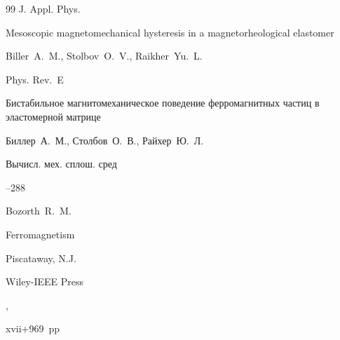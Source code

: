 \begin{thebibliography}{99}
\jour J. Appl. Phys.





 \nofrills





\paper Mesoscopic magnetomechanical hysteresis in a magnetorheological elastomer

\by Biller~A.~M., Stolbov~O.~V., Raikher~Yu.~L.

\jour Phys. Rev.~E





 \nofrills





\paper Бистабильное магнитомеханическое поведение ферромагнитных частиц в эластомерной матрице

\by Биллер~А.~М., Столбов~О.~В., Райхер~Ю.~Л.

\jour Вычисл. мех. сплош. сред




--288






\by Bozorth~R.~M.

\book Ferromagnetism

\publaddr  Piscataway, N.J.

\publ Wiley-IEEE Press

,


xvii+969~pp






\end{thebibliography}

